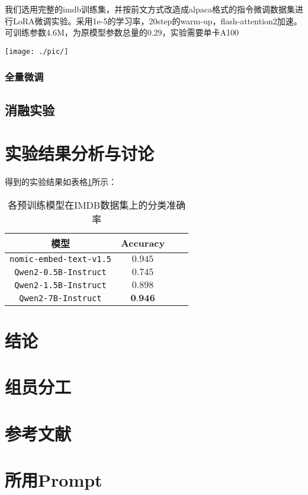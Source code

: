 \documentclass{article}
\begin{document}
我们选用完整的imdb训练集，并按前文方式改造成alpaca格式的指令微调数据集进行LoRA微调实验。采用1e-5的学习率，20step的warm-up，flash-attention2\cite{dao2023flashattention2}加速。可训练参数4.6M，为原模型参数总量的0.29，实验需要单卡A100

\texttt{[image: ./pic/]}

\subsubsection{全量微调}

\subsection{消融实验}

\section{实验结果分析与讨论}

得到的实验结果如表格\ref{tab:pretrained_results}所示：
\begin{table}[htbp]
  \caption{\small{各预训练模型在IMDB数据集上的分类准确率}}
  \label{tab:pretrained_results}
  \centering
  \begin{tabular}{cccc}
    \toprule
    模型                   & Accuracy         \\
    \midrule
    \verb|nomic-embed-text-v1.5| & $0.945$          \\
    \midrule
    \verb|Qwen2-0.5B-Instruct| & $0.745$          \\
    \midrule
    \verb|Qwen2-1.5B-Instruct| & $0.898$          \\
    \midrule
    \verb|Qwen2-7B-Instruct| & $\textbf{0.946}$ \\
    \bottomrule
  \end{tabular}
\end{table}

\section{结论}


\section{组员分工}

\section{参考文献}




\appendix
\section{所用Prompt}
\end{document}
